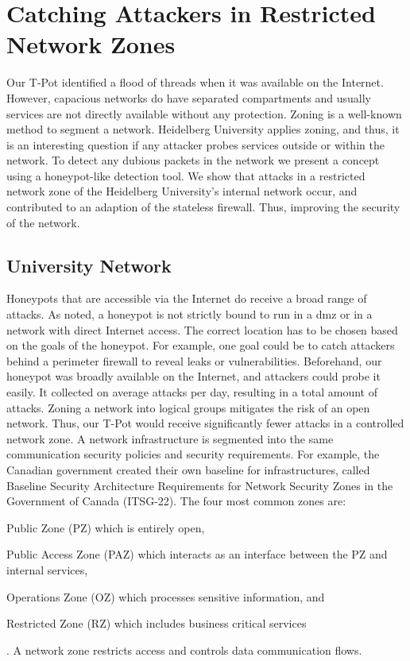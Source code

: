 \chapter{Catching Attackers in Restricted Network Zones}
\label{chap:concept}

Our T-Pot identified a flood of threads when it was available on the Internet.
However, capacious networks do have separated compartments and usually services are not directly available without any protection.
Zoning is a well-known method to segment a network.
Heidelberg University applies zoning, and thus, it is an interesting question if any attacker probes services outside or within the network.
To detect any dubious packets in the network we present a concept using a honeypot-like detection tool.
We show that attacks in a restricted network zone of the Heidelberg University's internal network occur, and contributed to an adaption of the stateless firewall.
Thus, improving the security of the network.

\section{University Network}

Honeypots that are accessible via the Internet do receive a broad range of attacks.
As \citet{Spitzner2003} noted, a honeypot is not strictly bound to run in a \ac{dmz} or in a network with direct Internet access.
The correct location has to be chosen based on the goals of the honeypot.
For example, one goal could be to catch attackers behind a perimeter firewall to reveal leaks or vulnerabilities.
Beforehand, our honeypot was broadly available on the Internet, and attackers could probe it easily.
It collected on average  attacks per day, resulting in a total amount of  attacks.
Zoning a network into logical groups mitigates the risk of an open network.
Thus, our T-Pot would receive significantly fewer attacks in a controlled network zone.
A network infrastructure is segmented into the same communication security policies and security requirements.
For example, the Canadian government created their own baseline for infrastructures, called Baseline Security Architecture Requirements for Network Security Zones in the Government of Canada (ITSG-22).
The four most common zones are:
\begin{enumerate*}[label=(\roman*)]
    \item Public Zone (PZ) which is entirely open,
    \item Public Access Zone (PAZ) which interacts as an interface between the PZ and internal services,
    \item Operations Zone (OZ) which processes sensitive information, and
    \item Restricted Zone (RZ) which includes business critical services
\end{enumerate*}.
A network zone restricts access and controls data communication flows. \cite{csec2021}

